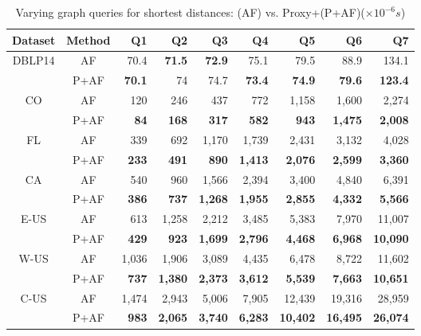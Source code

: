 \begin{table}[t!]
\label{tab:performance_dist_queries_af}
\caption{Varying graph queries  for shortest distances: \arcflag (AF) vs. Proxy+\arcflag (P+AF)($\times 10^{-6}s$)}
\vspace{-1ex}
\begin{center}
\begin{tabular}{|c|c|r|r|r|r|r|r|r|}
\hline

Dataset & Method & Q1 & Q2 & Q3 & Q4 & Q5 & Q6 &Q7  \\ \hline \hline
\multirow{2}{*}{DBLP14} & AF & 70.4 & {\bf71.5} & {\bf72.9} & 75.1 & 79.5 & 88.9 & 134.1 \\ \cline{2-9}
                       & P+AF& {\bf70.1} & 74 & 74.7 & {\bf73.4} & {\bf74.9} & {\bf79.6} & {\bf123.4} \\ \hline
\multirow{2}{*}{CO}     & AF & 120 & 246 & 437 & 772 & 1,158 & 1,600 & 2,274 \\ \cline{2-9}
                       & P+AF& {\bf84} & {\bf168} & {\bf317} & {\bf582} & {\bf943} & {\bf1,475} & {\bf2,008} \\ \hline
\multirow{2}{*}{FL}     & AF & 339 & 692 & 1,170 & 1,739 & 2,431 & 3,132 & 4,028 \\ \cline{2-9}
                       & P+AF& {\bf233} & {\bf491} & {\bf890} & {\bf1,413} & {\bf2,076} & {\bf2,599} & {\bf3,360} \\ \hline
\multirow{2}{*}{CA}     & AF & 540 & 960 & 1,566 & 2,394 & 3,400 & 4,840 & 6,391 \\ \cline{2-9}
                       & P+AF& {\bf386} & {\bf737} & {\bf1,268} & {\bf1,955} & {\bf2,855} & {\bf4,332} & {\bf5,566} \\ \hline
\multirow{2}{*}{E-US}   & AF & 613 & 1,258 & 2,212 & 3,485 & 5,383 & 7,970 & 11,007 \\ \cline{2-9}
                       & P+AF& {\bf429} & {\bf923} & {\bf1,699} & {\bf2,796} & {\bf4,468} & {\bf6,968} & {\bf10,090} \\ \hline
\multirow{2}{*}{W-US}   & AF & 1,036 & 1,906 & 3,089 & 4,435 & 6,478 & 8,722 & 11,602 \\ \cline{2-9}
                       & P+AF& {\bf737} & {\bf1,380} & {\bf2,373} & {\bf3,612} & {\bf5,539} & {\bf7,663} & {\bf10,651} \\ \hline
\multirow{2}{*}{C-US}   & AF & 1,474 & 2,943 & 5,006 & 7,905 & 12,439 & 19,316 & 28,959 \\ \cline{2-9}
                       & P+AF& {\bf983} & {\bf2,065} & {\bf3,740} & {\bf6,283} & {\bf10,402} & {\bf16,495} & {\bf26,074} \\ \hline
\end{tabular}
\end{center}
\end{table}

